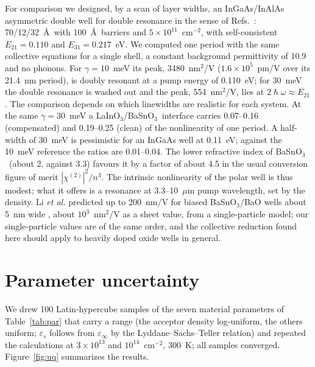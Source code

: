 \documentclass[11pt]{article}
\newcommand{\LIO}{\texorpdfstring{LaInO$_3$}{LaInO3}}
\newcommand{\BSO}{\texorpdfstring{BaSnO$_3$}{BaSnO3}}
\begin{document}
For comparison we designed, by a scan of layer widths, an InGaAs/InAlAs asymmetric double well for double resonance in the sense of Refs.~\cite{RosencherBois1991,Vurgaftman1996SSC}: 70/12/32~\AA\ with 100~\AA\ barriers and $5\times10^{11}$~cm$^{-2}$, with self-consistent $E_{21}=0.110$ and $E_{31}=0.217$~eV. We computed one period with the same collective equations for a single shell, a constant background permittivity of 10.9 and no phonons. For $\gamma=10$~meV its peak, 3480~nm$^2$/V ($1.6\times10^5$~pm/V over its 21.4~nm period), is doubly resonant at a pump energy of 0.110~eV; for 30~meV the double resonance is washed out and the peak, 554~nm$^2$/V, lies at $2\hslash\omega\approx E_{21}$. The comparison depends on which linewidths are realistic for each system. At the same $\gamma=30$~meV a \LIO/\BSO\ interface carries 0.07--0.16 (compensated) and 0.19--0.25 (clean) of the nonlinearity of one period. A half-width of 30~meV is pessimistic for an InGaAs well at 0.11~eV; against the 10~meV reference the ratios are 0.01--0.04. The lower refractive index of \BSO\ (about 2, against 3.3) favours it by a factor of about 4.5 in the usual conversion figure of merit $|\chi^{(2)}|^2/n^3$. The intrinsic nonlinearity of the polar well is thus modest; what it offers is a resonance at 3.3--10~$\mu$m pump wavelength, set by the density. Li \emph{et al.} predicted up to 200~nm/V for biased \BSO/BaO wells about 5~nm wide \cite{Li2021BSO}, about $10^{3}$~nm$^2$/V as a sheet value, from a single-particle model; our single-particle values are of the same order, and the collective reduction found here should apply to heavily doped oxide wells in general.

\section{Parameter uncertainty}\label{sec:uq}
We drew 100 Latin-hypercube samples of the seven material parameters of Table~\ref{tab:par} that carry a range (the acceptor density log-uniform, the others uniform; $\varepsilon_s$ follows from $\varepsilon_\infty$ by the Lyddane--Sachs--Teller relation) and repeated the calculations at $3\times10^{13}$ and $10^{14}$~cm$^{-2}$, 300~K; all samples converged. Figure~\ref{fig:uq} summarizes the results.
\end{document}
